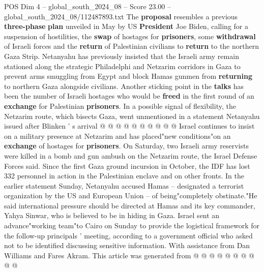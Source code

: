 \begin{textsample}{POS Dim 4 – global\_south\_2024\_08 – Score 23.00 – global\_south\_2024\_08/112487893.txt}
The \textbf{proposal} resembles a previous \textbf{three-phase} \textbf{plan} unveiled in May by US \textbf{President} Joe Biden, calling for a suspension of hostilities, the \textbf{swap} of hostages for \textbf{prisoners}, some \textbf{withdrawal} of Israeli forces and the \textbf{return} of Palestinian civilians to \textbf{return} to the northern Gaza Strip.
Netanyahu has previously insisted that the Israeli army remain stationed along the strategic Philadelphi and Netzarim corridors in Gaza to prevent arms smuggling from Egypt and block Hamas gunmen from \textbf{returning} to northern Gaza alongside civilians.
Another sticking point in the \textbf{talks} has been the number of Israeli hostages who would be \textbf{freed} in the first round of an \textbf{exchange} for Palestinian \textbf{prisoners}.
In a possible signal of flexibility, the Netzarim route, which bisects Gaza, went unmentioned in a statement Netanyahu issued after Blinken ' s arrival @ @ @ @ @ @ @ @ @ @ Israel continues to insist on a military presence at Netzarim and has placed"new conditions"on an \textbf{exchange} of hostages for \textbf{prisoners}.
On Saturday, two Israeli army reservists were killed in a bomb and gun ambush on the Netzarim route, the Israel Defense Forces said.
Since the first Gaza ground incursion in October, the IDF has lost 332 personnel in action in the Palestinian enclave and on other fronts.
In the earlier statement Sunday, Netanyahu accused Hamas -- designated a terrorist organization by the US and European Union -- of being"completely obstinate."He said international pressure should be directed at Hamas and its key commander, Yahya Sinwar, who is believed to be in hiding in Gaza.
Israel sent an advance"working team"to Cairo on Sunday to provide the logistical framework for the follow-up principals ' meeting, according to a government official who asked not to be identified discussing sensitive information.
With assistance from Dan Williams and Fares Akram.
This article was generated from @ @ @ @ @ @ @ @ @ @

\end{textsample}
